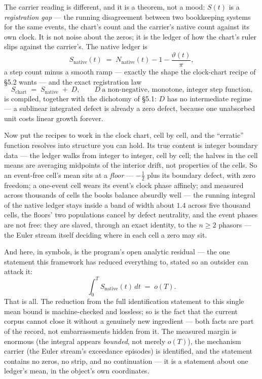 \documentclass[11pt]{article}
\begin{document}
The carrier reading is different, and it is a theorem, not a mood: $S(t)$ is a
\emph{registration gap} --- the running disagreement between two bookkeeping
systems for the same events, the chart's count and the carrier's native count
against its own clock.  It is not noise about the zeros; it is the ledger of
how the chart's ruler slips against the carrier's.  The native ledger is
\[
S_{\mathrm{native}}(t)\;=\;N_{\mathrm{native}}(t)-1-\frac{\vartheta(t)}{\pi},
\]
a step count minus a smooth ramp --- exactly the shape the clock-chart recipe
of \S5.2 wants --- and the exact registration law
\[
S_{\mathrm{chart}}\;=\;S_{\mathrm{native}}\;+\;D,
\qquad D\ \text{a non-negative, monotone, integer step function,}
\]
is compiled, together with the dichotomy of \S5.1: $D$ has no intermediate
regime --- a sublinear integrated defect is already a zero defect, because one
unabsorbed unit costs linear growth forever.

Now put the recipes to work in the clock chart, cell by cell, and the
``erratic'' function resolves into structure you can hold.  Its true content
is integer boundary data --- the ledger walks from integer to integer, cell
by cell; the halves in the cell means are averaging midpoints of the
interior drift, not properties of the cells.  So an event-free cell's mean
sits at a \emph{floor} --- $-\tfrac12$ plus its boundary defect, with zero
freedom; a one-event cell wears its event's clock phase affinely;
and measured across thousands of cells the books balance absurdly well --- the
running integral of the native ledger stays inside a band of width about
$1.4$ across five thousand cells, the floors' two populations cancel by defect
neutrality, and the event phases are not free: they are slaved, through an
exact identity, to the $n\ge2$ phasors --- the Euler stream itself deciding
where in each cell a zero may sit.

And here, in symbols, is the program's open analytic residual --- the one
statement this framework has reduced everything to, stated so an outsider can
attack it:
\[
\boxed{\ \int_0^{T} S_{\mathrm{native}}(t)\,dt\;=\;o(T).\ }
\]
That is all.  The reduction from the full identification statement to this
single mean bound is machine-checked and lossless; so is the fact that the
current corpus cannot close it without a genuinely new ingredient --- both
facts are part of the record, not embarrassments hidden from it.  The measured
margin is enormous (the integral appears \emph{bounded}, not merely $o(T)$),
the mechanism carrier (the Euler stream's exceedance episodes) is identified,
and the statement contains no zeros, no strip, and no continuation --- it is a
statement about one ledger's mean, in the object's own coordinates.
\end{document}
